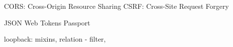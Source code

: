 CORS: Cross-Origin Resource Sharing
CSRF: Cross-Site Request Forgery

JSON Web Tokens
Passport

loopback: 
mixins, relation - filter, 